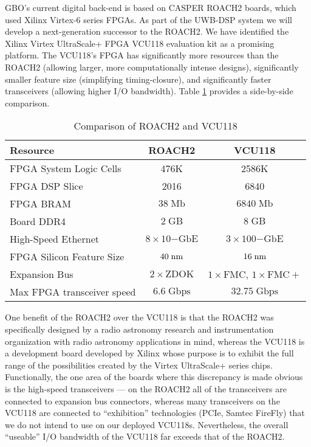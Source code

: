 \documentclass[10pt]{myNSF}
\begin{document}
 GBO's current digital back-end is based
on CASPER ROACH2 boards, which used Xilinx Virtex-6 series FPGAs.  As
part of the UWB-DSP system we will develop a next-generation successor
to the ROACH2.  We have identified the Xilinx Virtex UltraScale+ FPGA
VCU118 evaluation kit as a promising platform.  The VCU118’s FPGA has
significantly more resources than the ROACH2 (allowing larger, more
computationally intense designs), significantly smaller feature size
(simplifying timing-closure), and significantly faster transceivers
(allowing higher I/O bandwidth).  Table \ref{table:fpga} provides a
side-by-side comparison.

\begin{table}[h]
  \centering
  \caption{Comparison of ROACH2 and VCU118 \label{table:fpga}}
  \begin{tabular}{|l|c|c|}
    \hline
    Resource & ROACH2 & VCU118 \\
    \hline
    FPGA System Logic Cells & 476K & 2586K \\
    FPGA DSP Slice & 2016 & 6840 \\
    FPGA BRAM & $38\; \mathrm{Mb}$ & $6840\; \mathrm{Mb}$ \\
    Board DDR4 & $2\; \mathrm{GB}$ & $8\; \mathrm{GB}$ \\
    High-Speed Ethernet & $8 \times 10\mathrm{-GbE}$ & $3 \times 100\mathrm{-GbE}$ \\
    FPGA Silicon Feature Size & $40\; \textrm{nm}$ & $16\; \textrm{nm}$ \\
    Expansion Bus & $2 \times \mathrm{ZDOK}$ & $1 \times \mathrm{FMC}$, $1 \times \mathrm{FMC}+$ \\
    Max FPGA transceiver speed & $6.6\; \mathrm{Gbps}$ & $32.75\; \mathrm{Gbps}$ \\
    \hline
  \end{tabular}
\end{table}

One benefit of the ROACH2 over the VCU118 is that the ROACH2 was
specifically designed by a radio astronomy research and
instrumentation organization with radio astronomy applications in
mind, whereas the VCU118 is a development board developed by Xilinx
whose purpose is to exhibit the full range of the possibilities
created by the Virtex UltraScale+ series chips. Functionally, the one
area of the boards where this discrepancy is made obvious is the
high-speed transceivers --- on the ROACH2 all of the transceivers are
connected to expansion bus connectors, whereas many transceivers on
the VCU118 are connected to ``exhibition'' technologies (PCIe, Samtec
FireFly) that we do not intend to use on our deployed
VCU118s. Nevertheless, the overall ``useable'' I/O bandwidth of the
VCU118 far exceeds that of the ROACH2.
\end{document}
